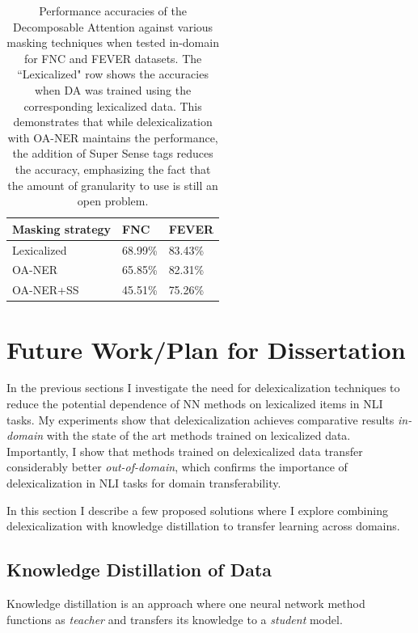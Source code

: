 \documentclass[compsoc,onecolumn]{IEEEtran}
\begin{document}
\begin{table}[h!]
\begin{center}
\begin{tabular}{|p{20mm}|p{9mm}|p{10mm}|}
 \hline
\textbf{Masking strategy} & \textbf{FNC}  & \textbf{FEVER}  \\ 
\hline
Lexicalized &68.99\% &83.43\% \\
OA-NER &65.85\% &82.31\%\\
OA-NER+SS & 45.51\% &75.26\%\\
\hline
\end{tabular}
\end{center}
    \caption{Performance accuracies of the Decomposable Attention against various masking techniques when tested in-domain for FNC and FEVER datasets. The ``Lexicalized" row shows the accuracies when DA was trained using the corresponding lexicalized data. This demonstrates that while delexicalization with OA-NER maintains the performance, the addition of Super Sense tags reduces the accuracy, emphasizing the fact that the amount of granularity to use is still an open problem.}
    \label{sstag}
\end{table}


\section{Future Work/Plan for Dissertation}
In the previous sections I investigate the need for delexicalization techniques to reduce the potential dependence of NN methods on lexicalized items in NLI tasks. My experiments show that delexicalization achieves comparative results {\em in-domain} with the state of the art methods trained on lexicalized data. Importantly, I show that methods trained on delexicalized data transfer considerably better {\em out-of-domain}, which  confirms the importance of delexicalization in NLI tasks for domain transferability.

In this section I describe a few proposed solutions where I explore combining delexicalization with knowledge distillation to transfer learning across domains.





\subsection{Knowledge Distillation of Data}
Knowledge distillation \citep*{ba2014deep,hinton2015distilling} is an approach where one neural network method functions as \textit{teacher} and transfers its knowledge to a \textit{student} model. 
\end{document}
